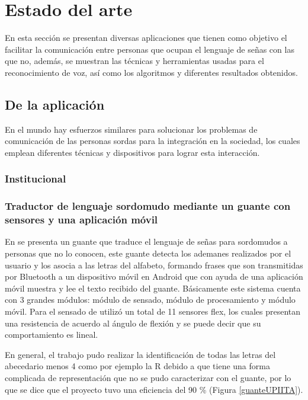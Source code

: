 
	\section{Estado del arte}\label{sec:stateoftheart}
	
	En esta sección se presentan diversas aplicaciones que tienen como objetivo el facilitar la comunicación entre personas que ocupan el lenguaje de señas con las que no, además, se muestran las técnicas y herramientas usadas para el reconocimiento de voz, así como los algoritmos y diferentes resultados obtenidos.
	
	\subsection{De la aplicación}

	En el mundo hay esfuerzos similares para solucionar los problemas de comunicación de las personas sordas para la integración en la sociedad, los cuales emplean diferentes técnicas y dispositivos para lograr esta interacción.

	\subsubsection*{Institucional}

	\subsubsection*{Traductor de lenguaje sordomudo mediante un guante con sensores y una aplicación móvil}

	En \cite{LunaGarcia2015} se presenta un guante que traduce el lenguaje de señas para sordomudos a personas que no lo conocen, este guante detecta los ademanes realizados por el usuario y los asocia a las letras del alfabeto, formando frases que son transmitidas por Bluetooth a un dispositivo móvil en Android que con ayuda de una aplicación móvil muestra y lee el texto recibido del guante. Básicamente este sistema cuenta con 3 grandes módulos: módulo de sensado, módulo de procesamiento y módulo móvil. Para el sensado de utilizó un total de 11 sensores flex, los cuales presentan una resistencia de acuerdo al ángulo de flexión y se puede decir que su comportamiento es lineal.

	En general, el trabajo pudo realizar la identificación de todas las letras del abecedario menos 4 como por ejemplo la R debido a que tiene una forma complicada de representación que no se pudo caracterizar con el guante, por lo que se dice que el proyecto tuvo una eficiencia del 90 \% (Figura \ref{guanteUPIITA}).

